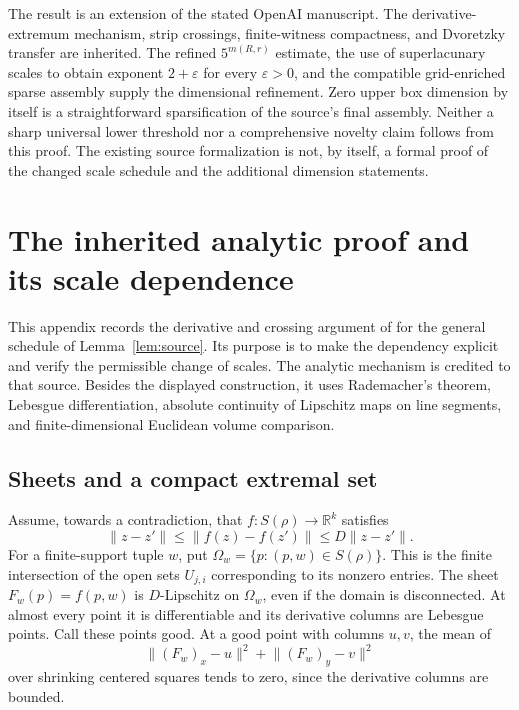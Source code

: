 \documentclass[11pt]{article}
\theoremstyle{remark}
\newcommand{\R}{\mathbb R}
\newcommand{\norm}[1]{\lVert#1\rVert}
\begin{document}
The result is an extension of the stated OpenAI manuscript. The derivative-extremum mechanism, strip crossings, finite-witness compactness, and Dvoretzky transfer are inherited. The refined $5^{m(R,r)}$ estimate, the use of superlacunary scales to obtain exponent $2+\varepsilon$ for every $\varepsilon>0$, and the compatible grid-enriched sparse assembly supply the dimensional refinement. Zero upper box dimension by itself is a straightforward sparsification of the source's final assembly. Neither a sharp universal lower threshold nor a comprehensive novelty claim follows from this proof. The existing source formalization is not, by itself, a formal proof of the changed scale schedule and the additional dimension statements.

\appendix
\section{The inherited analytic proof and its scale dependence}\label{sec:appendix}
This appendix records the derivative and crossing argument of \cite[Sections 3--5]{OpenAI} for the general schedule of Lemma~\ref{lem:source}. Its purpose is to make the dependency explicit and verify the permissible change of scales. The analytic mechanism is credited to that source. Besides the displayed construction, it uses Rademacher's theorem, Lebesgue differentiation, absolute continuity of Lipschitz maps on line segments, and finite-dimensional Euclidean volume comparison.

\subsection{Sheets and a compact extremal set}
Assume, towards a contradiction, that $f:S(\rho)\to\R^k$ satisfies
\begin{equation}\label{eq:bilip}
 \norm{z-z'}\le\norm{f(z)-f(z')}\le D\norm{z-z'}.
\end{equation}
For a finite-support tuple $w$, put $\Omega_w=\{p:(p,w)\in S(\rho)\}$. This is the finite intersection of the open sets $U_{j,i}$ corresponding to its nonzero entries. The sheet $F_w(p)=f(p,w)$ is $D$-Lipschitz on $\Omega_w$, even if the domain is disconnected. At almost every point it is differentiable and its derivative columns are Lebesgue points. Call these points good. At a good point with columns $u,v$, the mean of
\[
 \norm{(F_w)_x-u}^2+\norm{(F_w)_y-v}^2
\]
over shrinking centered squares tends to zero, since the derivative columns are bounded.
\end{document}
